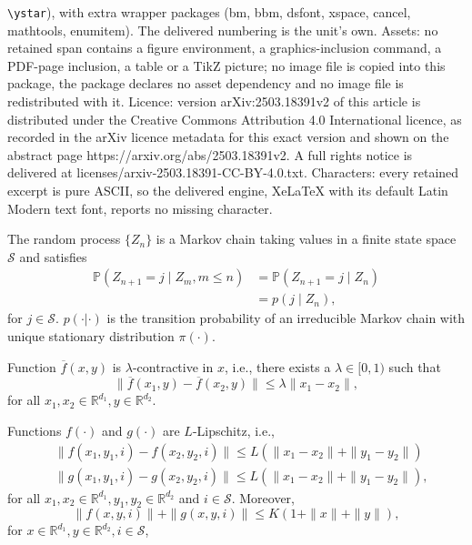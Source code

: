 \documentclass[10pt,a4paper]{amsart}
\newcommand{\PP}{\mathbb{P}}
\newcommand{\RR}{\mathbb{R}}
\newcommand{\Scal}{\mathcal{S}}
\newcommand{\barf}{\overline{f}}
\begin{document}
\texttt{\textbackslash ystar}), with extra wrapper packages (bm, bbm, dsfont, xspace, cancel, mathtools, enumitem). The delivered numbering is the unit's own. Assets: no retained span contains a figure environment, a graphics-inclusion command, a PDF-page inclusion, a table or a TikZ picture; no image file is copied into this package, the package declares no asset dependency and no image file is redistributed with it. Licence: version arXiv:2503.18391v2 of this article is distributed under the Creative Commons Attribution 4.0 International licence, as recorded in the arXiv licence metadata for this exact version and shown on the abstract page https://arxiv.org/abs/2503.18391v2. A full rights notice is delivered at licenses/arxiv-2503.18391-CC-BY-4.0.txt. Characters: every retained excerpt is pure ASCII, so the delivered engine, XeLaTeX with its default Latin Modern text font, reports no missing character.
\begin{assumption}\label{assu-Markov}
    The random process $\{Z_n\}$ is a Markov chain taking values in a finite state space $\Scal$ and satisfies
    \begin{align*}
        \PP(Z_{n+1}=j\mid Z_m, m\leq n)&=\PP(Z_{n+1}=j\mid Z_n)\\
        &=p(j\mid Z_n),
    \end{align*}
    for $j\in\Scal$. $p(\cdot|\cdot)$ is the transition probability of an irreducible Markov chain with unique stationary distribution $\pi(\cdot)$.
\end{assumption}

\begin{assumption}\label{assu-contractive-f}
Function $\barf(x,y)$ is $\lambda$-contractive in $x$, i.e., there exists a $\lambda\in [0,1)$ such that 
\begin{equation}
    \|\barf(x_1,y)-\barf(x_2,y)\|\leq \lambda \|x_1-x_2\|,
\end{equation}
for all $x_1,x_2\in\RR^{d_1}, y\in\RR^{d_2}$.
\end{assumption}

\begin{assumption}\label{assu-Lipschitz}
Functions $f(\cdot)$ and $g(\cdot)$ are $L$-Lipschitz, i.e.,
\begin{align*}
    &\|f(x_1,y_1,i)-f(x_2,y_2,i)\|\leq L(\|x_1-x_2\|+\|y_1-y_2\|)\\
    &\|g(x_1,y_1,i)-g(x_2,y_2,i)\|\leq L(\|x_1-x_2\|+\|y_1-y_2\|),
\end{align*}
for all $x_1,x_2\in\RR^{d_1}, y_1,y_2\in\RR^{d_2}$ and $i\in\Scal$. Moreover,
$$\|f(x,y,i)\|+\|g(x,y,i)\|\leq K(1+\|x\|+\|y\|),$$
for $x\in\RR^{d_1}, y\in\RR^{d_2},i\in\Scal$,
\end{assumption}
\end{document}

